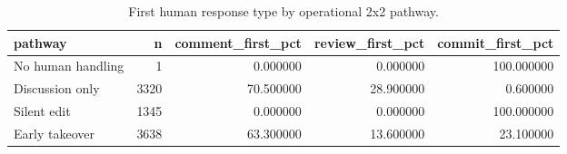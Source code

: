 \begin{table}[t]
\centering
\footnotesize
\caption{First human response type by operational 2x2 pathway.}
\label{tab:pathway-first-response}
\begin{tabular}{lrrrr}
\toprule
pathway & n & comment\_first\_pct & review\_first\_pct & commit\_first\_pct \\
\midrule
No human handling & 1 & 0.000000 & 0.000000 & 100.000000 \\
Discussion only & 3320 & 70.500000 & 28.900000 & 0.600000 \\
Silent edit & 1345 & 0.000000 & 0.000000 & 100.000000 \\
Early takeover & 3638 & 63.300000 & 13.600000 & 23.100000 \\
\bottomrule
\end{tabular}
\end{table}
